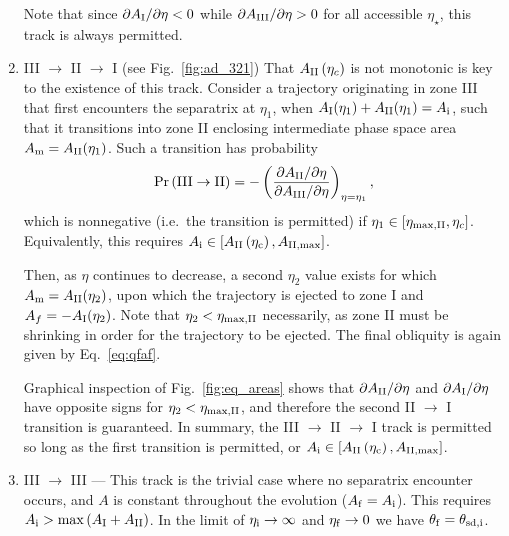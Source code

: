 \documentclass[
        fleqn,
        usenatbib,
    ]{mnras}
\newcommand*{\pdil}[2]{\partial#1 / \partial#2}
\newcommand*{\p}[1]{\left(#1\right)}
\newcommand*{\s}[1]{\left[#1\right]}
\begin{document}
\begin{enumerate}
        Note that since $\pdil{A_{\rm I}}{\eta} < 0$ while $\pdil{A_{\rm
        III}}{\eta} > 0$ for all accessible $\eta_{\star}$, this track is
        always permitted.

    \item III $\to$ II $\to$ I (see Fig.~\ref{fig:ad_321}) That $A_{\rm II}
        \p{\eta_c}$ is not monotonic is key to the existence of this track.
        Consider a trajectory originating in zone III that first encounters the
        separatrix at $\eta_1$, when $A_{\rm I}(\eta_1) + A_{\rm II}(\eta_1) =
        A_{\rm i}$, such that it transitions into zone II enclosing
        intermediate phase space area $A_{\rm m} = A_{\rm II}(\eta_1)$. Such a
        transition has probability
        \begin{equation}
            \Pr\p{\rm III \to II} = -\p{
                \frac{\pdil{A_{\rm II}}{\eta}}{\pdil{A_{\rm III}}{\eta}}}
                    _{\eta = \eta_1},
        \end{equation}
        which is nonnegative (i.e.\ the transition is permitted) if $\eta_1
        \in [\eta_{\rm \max, II}, \eta_c]$. Equivalently, this requires
        $A_{\rm i} \in \s{A_{\rm II}\p{\eta_{\rm c}} , A_{\rm II, \max}}$.

        Then, as $\eta$ continues to decrease, a second $\eta_2$ value exists
        for which $A_{\rm m} = A_{\rm II}(\eta_2)$, upon which the trajectory
        is ejected to zone I and $A_f = -A_{\rm I}(\eta_2)$. Note that $\eta_2
        < \eta_{\rm \max, II}$ necessarily, as zone II must be shrinking in
        order for the trajectory to be ejected. The final obliquity is again
        given by Eq.~\eqref{eq:qfaf}.

        Graphical inspection of Fig.~\ref{fig:eq_areas} shows that
        $\pdil{A_{\rm II}}{\eta}$ and $\pdil{A_{\rm I}}{\eta}$ have opposite
        signs for $\eta_2 < \eta_{\rm \max, II}$, and therefore the second II
        $\to$ I transition is guaranteed. In summary, the III $\to$ II $\to$ I
        track is permitted so long as the first transition is permitted, or
        $A_{\rm i} \in \s{A_{\rm II}\p{\eta_{\rm c}} , A_{\rm II, \max}}$.

    \item III $\to$ III --- This track is the trivial case where no separatrix
        encounter occurs, and $A$ is constant throughout the evolution ($A_{\rm
        f} = A_{\rm i}$). This requires $A_{\rm i} > \max \p{A_{\rm I} + A_{\rm
        II}}$. In the limit of $\eta_{\rm i} \to \infty$ and $ \eta_{\rm f} \to
        0$ we have $\theta_{\rm f} = \theta_{\rm sd, i}$.


\end{enumerate}
\end{document}
